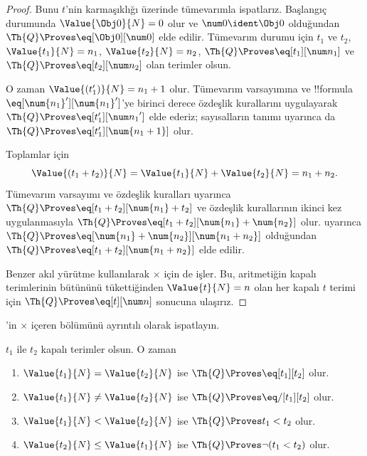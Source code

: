 \begin{proof}
Bunu $t$'nin karmaşıklığı üzerinde tümevarımla ispatlarız. Başlangıç
durumunda $\Value{\Obj 0}{N}=0$ olur ve $\num 0\ident\Obj 0$ olduğundan
$\Th{Q} \Proves \eq[\Obj 0][\num 0]$ elde edilir.
%
Tümevarım durumu için $t_1$ ve $t_2$,
$\Value{t_1}{N}=n_1$, $\Value{t_2}{N}=n_2$,
$\Th{Q} \Proves \eq[t_1][\num n_1]$ ve
$\Th{Q} \Proves \eq[t_2][\num n_2]$ olan terimler olsun.

O zaman $\Value{(t_1')}{N}=n_1+1$ olur. Tümevarım varsayımına ve
!!{formula} $\eq[\num{n_1}'][\num{n_1}']$'ye birinci derece özdeşlik
kurallarını uygulayarak $\Th{Q} \Proves \eq[t_1'][{\num n_1}']$ elde
ederiz; sayısalların tanımı uyarınca da
$\Th{Q} \Proves \eq[t_1'][\num{n_1+1}]$ olur.

Toplamlar için
\[
      \Value{(t_1 + t_2)}{N}
    = \Value{t_1}{N} + \Value{t_2}{N}
    = n_1 + n_2.
\]
Tümevarım varsayımı ve özdeşlik kuralları uyarınca
$\Th{Q} \Proves \eq[t_1+t_2][\num{n_1}+t_2]$ ve özdeşlik kurallarının
ikinci kez uygulanmasıyla
$\Th{Q} \Proves \eq[t_1+t_2][\num{n_1}+\num{n_2}]$ olur.
 uyarınca
$\Th{Q} \Proves \eq[\num{n_1}+\num{n_2}][\num{n_1+n_2}]$ olduğundan
$\Th{Q} \Proves \eq[t_1+t_2][\num{n_1+n_2}]$ elde edilir.

Benzer akıl yürütme  kullanılarak
$\times$ için de işler.
%
Bu, aritmetiğin kapalı terimlerinin bütününü tükettiğinden
$\Value{t}{N}=n$ olan her kapalı $t$ terimi için
$\Th{Q} \Proves \eq[t][\num n]$ sonucuna ulaşırız.
\end{proof}

\begin{prob}
'in $\times$ içeren bölümünü ayrıntılı olarak
ispatlayın.
\end{prob}

\begin{lem}
$t_1$ ile $t_2$ kapalı terimler olsun. O zaman
\begin{enumerate}
\item $\Value{t_1}{N}=\Value{t_2}{N}$ ise
    $\Th{Q} \Proves \eq[t_1][t_2]$ olur.
\item $\Value{t_1}{N}\neq\Value{t_2}{N}$ ise
    $\Th{Q} \Proves \eq/[t_1][t_2]$ olur.
\item $\Value{t_1}{N}<\Value{t_2}{N}$ ise
    $\Th{Q} \Proves t_1<t_2$ olur.
\item $\Value{t_2}{N}\leq\Value{t_1}{N}$ ise
    $\Th{Q} \Proves \lnot(t_1<t_2)$ olur.
\end{enumerate}
\end{lem}

